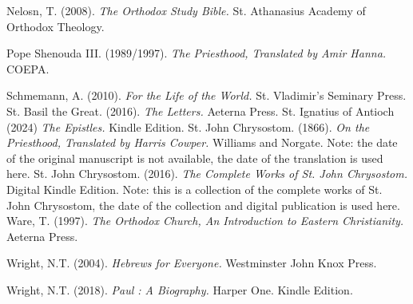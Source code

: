 \documentclass[12pt,doc]{apa7}   	%
\begin{document}
\begin{thebibliography}{15}
Nelosn, T. (2008). \emph{The Orthodox Study Bible.} St. Athanasius Academy of Orthodox Theology.

Pope Shenouda III. (1989/1997). \emph{The Priesthood, Translated by Amir Hanna.} COEPA. 

Schmemann, A. (2010). \emph{For the Life of the World.} St. Vladimir's Seminary Press.
St. Basil the Great. (2016). \emph{The Letters.} Aeterna Press.
St. Ignatius of Antioch (2024) \emph{The Epistles.} Kindle Edition.
St. John Chrysostom.  (1866). \emph{On the Priesthood, Translated by Harris Cowper.}  Williams and Norgate. Note: the date of the original manuscript is not available, the date of the translation is used here.
St. John Chrysostom.  (2016). \emph{The Complete Works of St. John Chrysostom.}  Digital Kindle Edition. Note: this is a collection of the complete works of St. John Chrysostom, the date of the collection and digital publication is used here. 
Ware, T. (1997). \emph{The Orthodox Church, An Introduction to Eastern Christianity.} Aeterna Press.

Wright, N.T. (2004). \emph{Hebrews for Everyone.} Westminster John Knox Press.


Wright, N.T. (2018). \emph{Paul : A Biography.} Harper One.  Kindle Edition.


\end{thebibliography}
\end{document}
